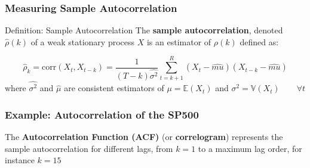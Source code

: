 \documentclass{beamer}
\begin{document}
\begin{frame}
  \frametitle{Measuring Sample Autocorrelation}
  \begin{block}{Definition: Sample Autocorrelation}
    The \textbf{sample autocorrelation}, denoted $\hat{\rho}(k)$ of a weak stationary process $X$ is an estimator of $\rho(k)$ defined as:

    \begin{equation*} 
      \hat{\rho}_k = \text{corr}(X_t, X_{t-k}) = \frac{1}{(T-k)\hat{\sigma^2}} \sum_{t=k+1}^{R}(X_t - \hat{mu})(X_{t-k} - \hat{mu})
    \end{equation*}
where $\hat{\sigma^2}$ and $\hat{\mu}$ are consistent estimators of $\mu = \mathbb{E}(X_t)$ and $\sigma^2 = \mathbb{V}(X_t) \qquad \forall t$
  \end{block}
\end{frame}


\begin{frame}
  \frametitle{Example: Autocorrelation of the SP500}
  The \textbf{Autocorrelation Function (ACF)} (or \textbf{correlogram}) represents the sample autocorrelation for different lags, from $k=1$ to a maximum lag order, for instance $k=15$

  
\end{frame}
\end{document}
